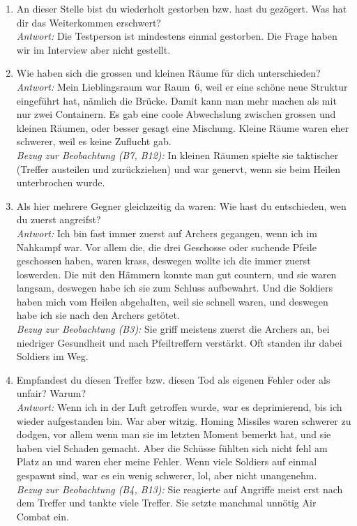 \documentclass[../Main.tex]{subfiles}
\begin{document}
\begin{enumerate}[label=\textbf{I\arabic*}, leftmargin=1.5cm, itemsep=1em]
\item An dieser Stelle bist du wiederholt gestorben bzw. hast du gezögert. Was hat dir das Weiterkommen erschwert? \\
\textit{Antwort:} Die Testperson ist mindestens einmal gestorben. Die Frage haben wir im Interview aber nicht gestellt.

\item Wie haben sich die grossen und kleinen Räume für dich unterschieden? \\
\textit{Antwort:} Mein Lieblingsraum war Raum~6, weil er eine schöne neue Struktur eingeführt hat, nämlich die Brücke. Damit kann man mehr machen als mit nur zwei Containern. Es gab eine coole Abwechslung zwischen grossen und kleinen Räumen, oder besser gesagt eine Mischung. Kleine Räume waren eher schwerer, weil es keine Zuflucht gab. \\
\textit{Bezug zur Beobachtung (B7, B12):} In kleinen Räumen spielte sie taktischer (Treffer austeilen und zurückziehen) und war genervt, wenn sie beim Heilen unterbrochen wurde.

\item Als hier mehrere Gegner gleichzeitig da waren: Wie hast du entschieden, wen du zuerst angreifst? \\
\textit{Antwort:} Ich bin fast immer zuerst auf Archers gegangen, wenn ich im Nahkampf war. Vor allem die, die drei Geschosse oder suchende Pfeile geschossen haben, waren krass, deswegen wollte ich die immer zuerst loswerden. Die mit den Hämmern konnte man gut countern, und sie waren langsam, deswegen habe ich sie zum Schluss aufbewahrt. Und die Soldiers haben mich vom Heilen abgehalten, weil sie schnell waren, und deswegen habe ich sie nach den Archers getötet. \\
\textit{Bezug zur Beobachtung (B3):} Sie griff meistens zuerst die Archers an, bei niedriger Gesundheit und nach Pfeiltreffern verstärkt. Oft standen ihr dabei Soldiers im Weg.

\item Empfandest du diesen Treffer bzw. diesen Tod als eigenen Fehler oder als unfair? Warum? \\
\textit{Antwort:} Wenn ich in der Luft getroffen wurde, war es deprimierend, bis ich wieder aufgestanden bin. War aber witzig. Homing Missiles waren schwerer zu dodgen, vor allem wenn man sie im letzten Moment bemerkt hat, und sie haben viel Schaden gemacht. Aber die Schüsse fühlten sich nicht fehl am Platz an und waren eher meine Fehler. Wenn viele Soldiers auf einmal gespawnt sind, war es ein wenig schwerer, lol, aber nicht unangenehm. \\
\textit{Bezug zur Beobachtung (B4, B13):} Sie reagierte auf Angriffe meist erst nach dem Treffer und tankte viele Treffer. Sie setzte manchmal unnötig Air Combat ein.


\end{enumerate}
\end{document}

